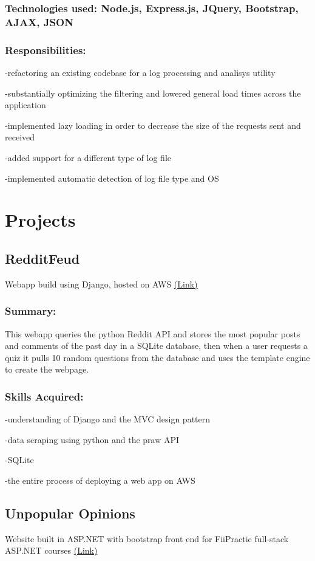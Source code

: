 \documentclass[a4paper,hidelinks,8pt]{article}
\begin{document}
\subsubsection{Technologies used: Node.js, Express.js, JQuery, Bootstrap, AJAX, JSON}
\subsubsection{Responsibilities:}
-refactoring an existing codebase for a log processing and analisys utility


-substantially optimizing the filtering and lowered general load times across the application

-implemented lazy loading in order to decrease the size of the requests sent and received

-added support for a different type of log file

-implemented automatic detection of log file type and OS

\section{Projects}
\subsection{RedditFeud}
Webapp build using Django, hosted on AWS \href{https:\\www.redditfeud.com}{(Link)}
\subsubsection{Summary:}
This webapp queries the python Reddit API and stores the most popular posts and comments of the past day
in a SQLite database, then when a user requests a quiz it pulls 10 random questions from the database and uses the template engine to create the webpage.
\subsubsection{Skills Acquired:}
-understanding of Django and the MVC design pattern

-data scraping using python and the praw API

-SQLite

-the entire process of deploying a web app on AWS

\subsection{Unpopular Opinions}
Website built in ASP.NET with bootstrap front end for FiiPractic full-stack ASP.NET courses \href{https://github.com/IureaMarius/UnpopularOpinions}{(Link)}
\end{document}
